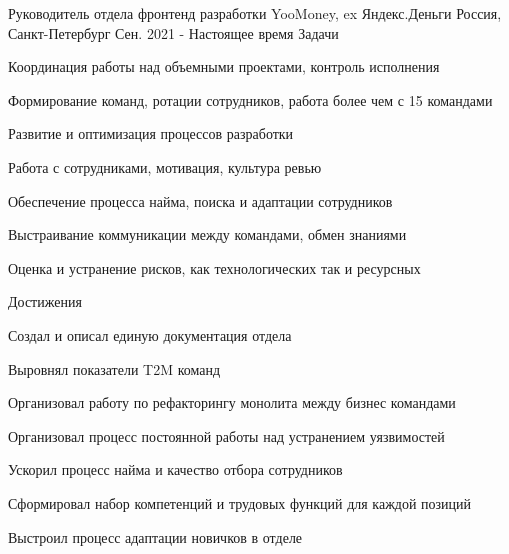 
\begin{cventries}

  \cvmultientry
    {Руководитель отдела фронтенд разработки}
    {YooMoney, ex Яндекс.Деньги}
    {Россия, Санкт-Петербург}
    {Сен. 2021 - Настоящее время}
    {Задачи}
    {
      \begin{cvitems}
        \item {Координация работы над объемными проектами, контроль исполнения}
        \item {Формирование команд, ротации сотрудников, работа более чем с 15 командами}
        \item {Развитие и оптимизация процессов разработки}
        \item {Работа с сотрудниками, мотивация, культура ревью}
        \item {Обеспечение процесса найма, поиска и адаптации сотрудников}
        \item {Выстраивание коммуникации между командами, обмен знаниями}
        \item {Оценка и устранение рисков, как технологических так и ресурсных}
      \end{cvitems}
    }
    {Достижения}
    {
      \begin{cvitems}
        \item {Создал и описал единую документация отдела}
        \item {Выровнял показатели T2M команд}
        \item {Организовал работу по рефакторингу монолита между бизнес командами}
        \item {Организовал процесс постоянной работы над устранением уязвимостей}
        \item {Ускорил процесс найма и качество отбора сотрудников}
        \item {Сформировал набор компетенций и трудовых функций для каждой позиций}
        \item {Выстроил процесс адаптации новичков в отделе}
      \end{cvitems}
    }


\end{cventries}
